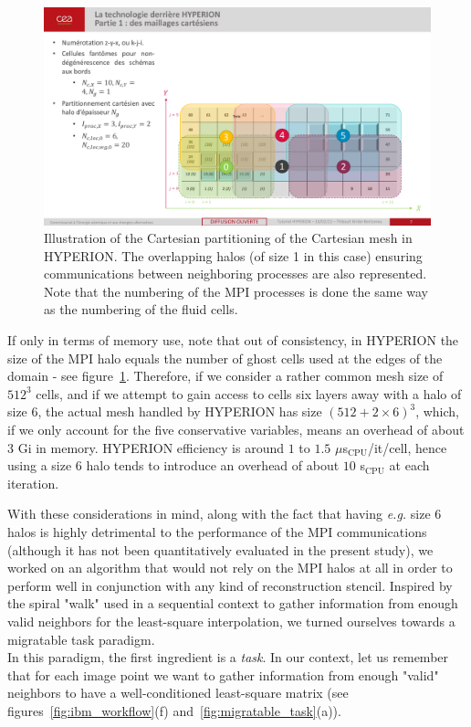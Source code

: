 \begin{figure}[ht!]
    \centering
    \includegraphics[width=0.75\linewidth]{chapter3_numerical_methods/pictures/mpi_halo.pdf}
    \caption{Illustration of the Cartesian partitioning of the Cartesian mesh in HYPERION.
    The overlapping halos (of size 1 in this case) ensuring communications between neighboring processes are also represented.
    Note that the numbering of the MPI processes is done the same way as the numbering of the fluid cells.}
    \label{fig:mpi_halos}
\end{figure}

If only in terms of memory use, note that out of consistency, in HYPERION the size of the MPI halo equals the number of ghost cells used at the edges of the domain - see figure~\ref{fig:mpi_halos}.
Therefore, if we consider a rather common mesh size of $512^3$ cells, and if we attempt to gain access to cells six layers away with a halo of size $6$, the actual mesh handled by HYPERION has size $(512 + 2 \times 6)^3$, which, if we only account for the five conservative variables, means an overhead of about $3$ Gi in memory.
HYPERION efficiency is around $1$ to $1.5$ $\mu$s$_{\text{CPU}}$/it/cell, hence using a size $6$ halo tends to introduce an overhead of about $10$ s$_{\text{CPU}}$ at each iteration.

With these considerations in mind, along with the fact that having \emph{e.g.} size $6$ halos is highly detrimental to the performance of the MPI communications (although it has not been quantitatively evaluated in the present study), we worked on an algorithm that would not rely on the MPI halos at all in order to perform well in conjunction with any kind of reconstruction stencil.
Inspired by the spiral "walk" used in a sequential context to gather information from enough valid neighbors for the least-square interpolation, we turned ourselves towards a migratable task paradigm. \\
In this paradigm, the first ingredient is a \emph{task}.
In our context, let us remember that for each image point we want to gather information from enough "valid" neighbors to have a well-conditioned least-square matrix (see figures~\ref{fig:ibm_workflow}(f) and~\ref{fig:migratable_task}(a)).

